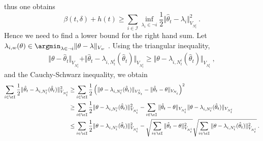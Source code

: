 thus one obtains
\[
\beta(t,\delta) + h(t) \geq\sum_{i\in \mathcal I} \inf_{\lambda_i\in \neg i} \frac{1}{2}\Vert \hat{\theta}_t - \lambda_i \Vert^2_{V_{N_t^i}}\,.
\]
Hence we need to find a lower bound for the right hand sum.
Let $\lambda_{i,w}(\theta) \in \argmin_{\lambda \in \neg i} \Vert \theta - \lambda \Vert_{V_{w}}$ . %
Using the triangular inequality,
\begin{align*}
\Vert \theta - \hat{\theta}_t \Vert_{V_{N_t^i}} + \Vert \hat{\theta}_t - \lambda_{i,N_t^i}(\hat{\theta}_t) \Vert_{V_{N_t^i}}
\geq\Vert \theta - \lambda_{i,N_t^i}(\hat{\theta}_t) \Vert_{V_{N_t^i}}
\:,
\end{align*}
and the Cauchy-Schwarz inequality, we obtain
\begin{align*}
\sum_{i\in\cI}\frac{1}{2}\Vert \hat{\theta}_t - \lambda_{i,N_t^i}(\hat{\theta}_t) \Vert_{V_{N_t^i}}^2
&\geq\sum_{i\in\cI}\frac{1}{2} \left(\Vert \theta - \lambda_{i,N_t^i}(\hat{\theta}_t) \Vert_{V_{N_t}^i} -\Vert \hat{\theta}_t -\theta \Vert_{V_{N_t^\mathit{}}} \right)^2\\
&\geq\sum_{i\in\cI}\frac{1}{2}\Vert \theta - \lambda_{i,N_t^i}(\hat{\theta}_t) \Vert_{V_{N_t^i}}^2
	-  \sum_{i\in\cI} \Vert \hat{\theta}_t -\theta \Vert_{V_{N_t^i}} \Vert \theta - \lambda_{i,N_t^i}(\hat{\theta}_t) \Vert_{V_{N_t^i}}\\
&\leq  \sum_{i\in\cI}\frac{1}{2}\Vert \theta - \lambda_{i,N_t^i}(\hat{\theta}_t) \Vert_{V_{N_t^i}}^2
	-  \sqrt{\sum_{i\in\cI} \Vert \hat{\theta}_t -\theta \Vert_{V_{N_t^i}}^2}\sqrt{\sum_{i\in\cI} \Vert \theta - \lambda_{i,N_t^i}(\hat{\theta}_t) \Vert_{V_{N_t^i}}^2}
\,.
\end{align*}

